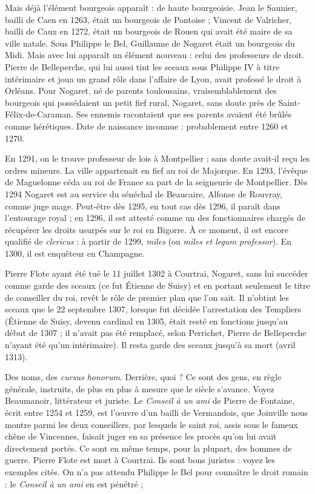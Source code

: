 \documentclass[french,twoside]{book} %
\begin{document}
Mais déjà l’élément bourgeois apparaît : de haute bourgeoisie. Jean le Saunier, bailli de Caen en 1263, était un bourgeois de Pontoise ; Vincent de Valricher, bailli de Caux en 1272, était un bourgeois de Rouen qui avait été maire de sa ville natale. Sous Philippe le Bel, Guillaume de Nogaret était un bourgeois du Midi. Mais avec lui apparaît un élément nouveau : celui des professeurs de droit. Pierre de Belleperche, qui lui aussi tint les sceaux sous Philippe IV à titre intérimaire et joua un grand rôle dans l’affaire de Lyon, avait professé le droit à Orléans. Pour Nogaret, né de parents toulousains, vraisemblablement des bourgeois qui possédaient un petit fief rural, Nogaret, sans doute près de Saint-Félix-de-Caraman. Ses ennemis racontaient que ses parents avaient été brûlés comme hérétiques. Date de naissance inconnue : probablement entre 1260 et 1270.\par
En 1291, on le trouve professeur de lois à Montpellier ; sans doute avait-il reçu les ordres mineurs. La ville appartenait en fief au roi de Majorque. En 1293, l’évêque de Maguelonne céda au roi de France sa part de la seigneurie de Montpellier. Dès 1294 Nogaret est au service du sénéchal de Beaucaire, Alfonse de Rouvray, comme juge mage. Peut-être dès 1295, en tout cas dès 1296, il paraît dans l’entourage royal ; en 1296, il est attesté comme un des fonctionnaires chargés de récupérer les droits usurpés sur le roi en Bigorre. À ce moment, il est encore qualifié de {\itshape clericus} : à partir de 1299, {\itshape miles} (ou {\itshape miles et legum professor}). En 1300, il est enquêteur en Champagne.\par
Pierre Flote ayant été tué le 11 juillet 1302 à Courtrai, Nogaret, sans lui succéder comme garde des sceaux (ce fut Étienne de Suisy) et en portant seulement le titre de conseiller du roi, revêt le rôle de premier plan que l’on sait. Il n’obtint les sceaux que le 22 septembre 1307, lorsque fut décidée l’arrestation des Templiers (Étienne de Suisy, devenu cardinal en 1305, était resté en fonctions jusqu’au début de 1307 ; il n’avait pas été remplacé, selon Perrichet, Pierre de Belleperche n’ayant été qu’un intérimaire). Il resta garde des sceaux jusqu’à sa mort (avril 1313).\par
Des noms, des {\itshape cursus honorum}. Derrière, quoi ? Ce sont des gens, en règle générale, instruits, de plus en plus à mesure que le siècle s’avance. Voyez Beaumanoir, littérateur et juriste. Le {\itshape Conseil à un ami} de Pierre de Fontaine, écrit entre 1254 et 1259, est l’œuvre d’un bailli de Vermandois, que Joinville nous montre parmi les deux conseillers, par lesquels le saint roi, assis sous le fameux chêne de Vincennes, faisait juger en sa présence les procès qu’on lui avait directement portés. Ce sont en même temps, pour la plupart, des hommes de guerre. Pierre Flote est mort à Courtrai. Ils sont bons juristes : voyez les exemples cités. On n’a pas attendu Philippe le Bel pour connaître le droit romain : le {\itshape Conseil à un ami} en est pénétré ;  
\end{document}
